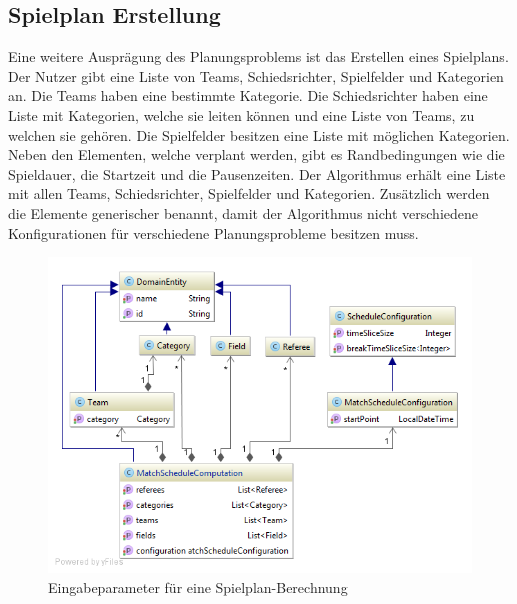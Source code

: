 %
%
%
%

\subsection{Spielplan Erstellung}
Eine weitere Ausprägung des Planungsproblems ist das Erstellen eines Spielplans. Der Nutzer gibt eine Liste von Teams, Schiedsrichter, Spielfelder und Kategorien an. Die Teams haben eine 
bestimmte Kategorie. Die Schiedsrichter haben eine Liste mit Kategorien, welche sie leiten können und eine Liste von Teams, zu welchen sie gehören. Die Spielfelder besitzen eine Liste mit 
möglichen Kategorien. Neben den Elementen, welche verplant werden, gibt es Randbedingungen wie die Spieldauer, die Startzeit und die Pausenzeiten. Der Algorithmus erhält eine 
Liste mit allen Teams, Schiedsrichter, Spielfelder und Kategorien. Zusätzlich werden die Elemente generischer benannt, damit der Algorithmus nicht verschiedene Konfigurationen für 
verschiedene Planungsprobleme besitzen muss.

\begin{figure}[h]
\centering
\includegraphics[scale=0.5]{images/probleme/matchSchedule.png}
\caption[Eingabeparameter für eine Spielplan-Berechnung]{Eingabeparameter für eine Spielplan-Berechnung \selfmade{}}
\label{fig:matchschedule_input}
\end{figure}

